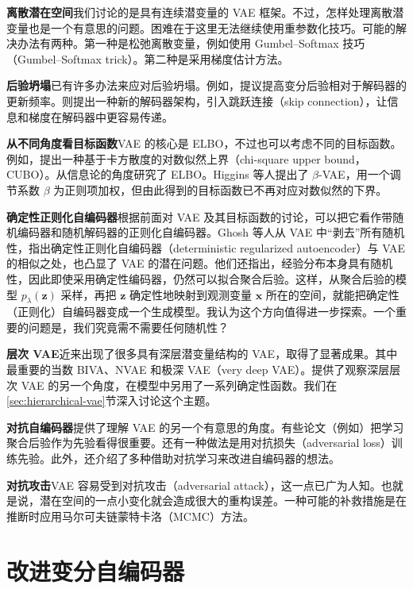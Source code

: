 \textbf{离散潜在空间}\quad 我们讨论的是具有连续潜变量的 VAE 框架。不过，怎样处理离散潜变量也是一个有意思的问题。困难在于这里无法继续使用重参数化技巧。可能的解决办法有两种。第一种是松弛离散变量，例如使用 Gumbel–Softmax 技巧（Gumbel–Softmax trick）。第二种是采用梯度估计方法。

\textbf{后验坍塌}\quad 已有许多办法来应对后验坍塌。例如，提议提高变分后验相对于解码器的更新频率。则提出一种新的解码器架构，引入跳跃连接（skip connection），让信息和梯度在解码器中更容易传递。

\textbf{从不同角度看目标函数}\quad VAE 的核心是 ELBO，不过也可以考虑不同的目标函数。例如，提出一种基于卡方散度的对数似然上界（chi-square upper bound，CUBO）。从信息论的角度研究了 ELBO。Higgins 等人提出了 $\beta$-VAE，用一个调节系数 $\beta$ 为正则项加权，但由此得到的目标函数已不再对应对数似然的下界。

\textbf{确定性正则化自编码器}\quad 根据前面对 VAE 及其目标函数的讨论，可以把它看作带随机编码器和随机解码器的正则化自编码器。Ghosh 等人从 VAE 中“剥去”所有随机性，指出确定性正则化自编码器（deterministic regularized autoencoder）与 VAE 的相似之处，也凸显了 VAE 的潜在问题。他们还指出，经验分布本身具有随机性，因此即使采用确定性编码器，仍然可以拟合聚合后验。这样，从聚合后验的模型 $p_\lambda(\mathbf{z})$ 采样，再把 $\mathbf{z}$ 确定性地映射到观测变量 $\mathbf{x}$ 所在的空间，就能把确定性（正则化）自编码器变成一个生成模型。我认为这个方向值得进一步探索。一个重要的问题是，我们究竟需不需要任何随机性？

\textbf{层次 VAE}\quad 近来出现了很多具有深层潜变量结构的 VAE，取得了显著成果。其中最重要的当数 BIVA、NVAE 和极深 VAE（very deep VAE）。提供了观察深层层次 VAE 的另一个角度，在模型中另用了一系列确定性函数。我们在\ref{sec:hierarchical-vae}节深入讨论这个主题。

\textbf{对抗自编码器}\quad {}提供了理解 VAE 的另一个有意思的角度。有些论文（例如）把学习聚合后验作为先验看得很重要。还有一种做法是用对抗损失（adversarial loss）训练先验。此外，还介绍了多种借助对抗学习来改进自编码器的想法。

\textbf{对抗攻击}\quad VAE 容易受到对抗攻击（adversarial attack），这一点已广为人知。也就是说，潜在空间的一点小变化就会造成很大的重构误差。一种可能的补救措施是在推断时应用马尔可夫链蒙特卡洛（MCMC）方法。

\section{改进变分自编码器}
